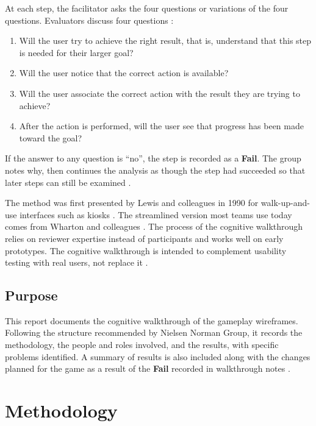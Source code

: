 \documentclass{article}
\newcommand{\fail}{{\textbf{Fail}}}
\begin{document}
At each step, the facilitator asks the four questions or variations of the four questions. 
Evaluators discuss four questions \cite{nng-overview, nng-workshop}:
\begin{enumerate}
  \item Will the user try to achieve the right result, that is, understand that this step 
  is needed for their larger goal?
  \item Will the user notice that the correct action is available?
  \item Will the user associate the correct action with the result they are trying to 
  achieve?
  \item After the action is performed, will the user see that progress has been made 
  toward the goal?
\end{enumerate}
If the answer to any question is ``no'', the step is recorded as a \fail{}. The group notes 
why, then continues the analysis as though the step had succeeded so that later steps can 
still be examined \cite{nng-workshop}.

The method was first presented by Lewis and colleagues in 1990 for walk-up-and-use interfaces 
such as kiosks \cite{lewis1990}. The streamlined version most teams use today comes from Wharton 
and colleagues \cite{wharton1994}. The process of the cognitive walkthrough relies on reviewer 
expertise instead of participants and works well on early prototypes. The cognitive walkthrough 
is intended to complement usability testing with real users, not replace it \cite{nng-overview}.

\subsection{Purpose}

This report documents the cognitive walkthrough of the \progname{} gameplay wireframes. Following 
the structure recommended by Nielsen Norman Group, it records the methodology, the people and 
roles involved, and the results, with specific problems identified. A summary of results is also 
included along with the changes planned for the game as a result of the \fail{} recorded in 
walkthrough notes \cite{nng-overview}.

\section{Methodology}\label{sec:method}
\end{document}
